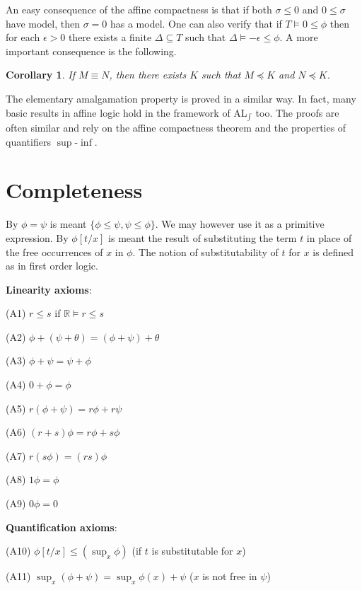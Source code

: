 \documentclass[12pt]{article}
\newtheorem{corollary}[theorem]{Corollary}
\def\Rn{\mathbb R}
\begin{document}
An easy consequence of the affine compactness is that if both $\sigma\leqslant0$ and
$0\leqslant\sigma$ have model, then $\sigma=0$ has a model.
One can also verify that if $T\vDash0\leqslant\phi$ then for each $\epsilon>0$
there exists a finite $\Delta\subseteq T$ such that $\Delta\vDash-\epsilon\leqslant\phi $.
A more important consequence is the following.

\begin{corollary}
If $M\equiv N$, then  there exists $K$ such that $M\preccurlyeq K$ and $N\preccurlyeq K$.
\end{corollary}

The elementary amalgamation property is proved in a similar way.
In fact, many basic results in affine logic hold in the framework of AL$_{\int}$ too.
The proofs are often similar and rely on the affine compactness theorem and the properties of quantifiers $\sup$-$\inf$.

\section{Completeness}
By $\phi=\psi$ is meant $\{\phi\leqslant\psi, \psi\leqslant\phi\}$.
We may however use it as a primitive expression. By $\phi[t/x]$ is meant the result
of substituting the term $t$ in place of the free occurrences of $x$ in $\phi$.
The notion of substitutability of $t$ for $x$ is defined as in first order logic.
\vspace{1mm}

{\bf Linearity axioms}:

(A1) $r\leqslant s$ \hspace{13mm} if $\Rn\vDash r\leqslant s$

(A2) $\phi+(\psi+\theta)=(\phi+\psi)+\theta$

(A3) $\phi+\psi=\psi+\phi$

(A4) $0+\phi=\phi$

(A5) $r(\phi+\psi)=r\phi+r\psi$

(A6) $(r+s)\phi=r\phi+s\phi$

(A7) $r(s\phi)=(rs)\phi$

(A8) $1\phi=\phi$

(A9) $0\phi=0$
\vspace{1mm}

{\bf Quantification axioms}:

(A10) $\phi[t/x]\leqslant(\sup_x\phi)$ \hspace{20mm} (if $t$ is substitutable for $x$)

(A11) $\sup_x(\phi+\psi)=\sup_x\phi(x)+\psi$ \hspace{6mm} ($x$ is not free in $\psi$)
\end{document}
